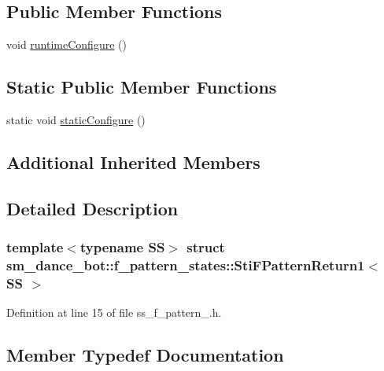 \subsection*{Public Member Functions}
\begin{DoxyCompactItemize}
\item 
void \hyperlink{classsm__dance__bot_1_1f__pattern__states_1_1StiFPatternReturn1_a888586201a9711546bbd53521d7b72ce}{runtime\+Configure} ()
\end{DoxyCompactItemize}
\subsection*{Static Public Member Functions}
\begin{DoxyCompactItemize}
\item 
static void \hyperlink{classsm__dance__bot_1_1f__pattern__states_1_1StiFPatternReturn1_a8dc2319ebc743b31189067897a9ace78}{static\+Configure} ()
\end{DoxyCompactItemize}
\subsection*{Additional Inherited Members}


\subsection{Detailed Description}
\subsubsection*{template$<$typename SS$>$\newline
struct sm\+\_\+dance\+\_\+bot\+::f\+\_\+pattern\+\_\+states\+::\+Sti\+F\+Pattern\+Return1$<$ S\+S $>$}



Definition at line 15 of file ss\+\_\+f\+\_\+pattern\+\_.\+h.



\subsection{Member Typedef Documentation}
\mbox{\label{classsm__dance__bot_1_1f__pattern__states_1_1StiFPatternReturn1_a2fcaf186ce44b90735584e304831f944}} 
